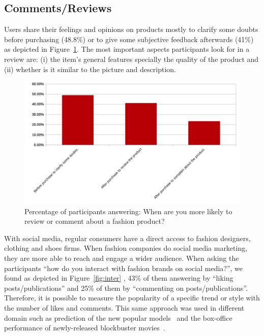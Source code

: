 \subsection{Comments/Reviews}


Users share their feelings and opinions on products mostly to clarify some doubts before purchasing (48.8\%) or to give some subjective feedback afterwards (41\%) as depicted in Figure~\ref{fig:perc}. The most important aspects participants look for in a review are: (i) the item’s general features specially the quality of the product and (ii) whether is it similar to the picture and description.


\begin{figure}[htb] \centering 
  \includegraphics[scale=0.6]{images/figs/comments_reviews}
  \caption{Percentage of participants answering: When are you more likely to review or comment about a fashion product?}
  \label{fig:perc}
\end{figure}


With social media, regular consumers have a direct access to fashion designers, clothing and shoes firms. When fashion companies do social media marketing, they are more able to reach and engage a wider audience. When asking the participants “how do you interact with fashion brands on social media?”, we found as depicted in Figure~\ref{fig:inter} , 43\% of them answering by “liking posts/publications” and 25\% of them by “commenting on posts/publications”. Therefore, it is possible to measure the popularity of a specific trend or style with the number of likes and comments. This same approach was used in different domain such as prediction of the new popular models~\cite{Park:2016:SAI:2818048.2820065} and the box-office performance of newly-released blockbuster movies~\cite{Asur11}.


